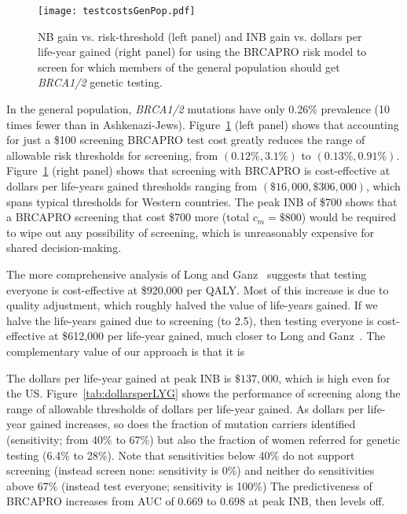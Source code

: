 \documentclass[11pt, letterpaper]{article}
\begin{document}
\begin{figure}[t!]
	\centering
	\texttt{[image: testcostsGenPop.pdf]}
	\caption{NB gain vs. risk-threshold (left panel) and INB gain vs. dollars per life-year gained (right panel) for using the BRCAPRO risk model to screen for which members of the general population should get \textit{BRCA1/2} genetic testing.}
	\label{fig:testcostsGenPop}
\end{figure}

In the general population, \textit{BRCA1/2} mutations have only 0.26\% prevalence (10 times fewer than in Ashkenazi-Jews).  Figure~\ref{fig:testcostsGenPop} (left panel) shows that accounting for just a \$100 screening BRCAPRO test cost greatly reduces the range of allowable risk thresholds for screening, from $(0.12\%,3.1\%)$ to $(0.13\%,0.91\%)$.  Figure~\ref{fig:testcostsGenPop} (right panel) shows that screening with BRCAPRO is cost-effective at dollars per life-years gained thresholds ranging from $(\$16,\!000,\$306,\!000)$, which spans typical thresholds for Western countries.  The peak INB of \$700 shows that a BRCAPRO screening that cost \$700 more (total $c_m=\$800$) would be required to wipe out any possibility of screening, which is unreasonably expensive for shared decision-making.  

The more comprehensive analysis of Long and Ganz~\cite{Long2015} suggests that testing everyone is cost-effective at \$920,000 per QALY.  Most of this increase is due to quality adjustment, which roughly halved the value of life-years gained.  If we halve the life-years gained due to screening (to 2.5), then testing everyone is cost-effective at \$612,000 per life-year gained, much closer to Long and Ganz~\cite{Long2015}.  The complementary value of our approach is that it is 

The dollars per life-year gained at peak INB is $\$137,\!000$, which is high even for the US.  Figure~\ref{tab:dollarsperLYG} shows the performance of screening along the range of allowable thresholds of dollars per life-year gained.  As dollars per life-year gained increases, so does the fraction of mutation carriers identified (sensitivity; from 40\% to 67\%) but also the fraction of women referred for genetic testing (6.4\% to 28\%).  Note that sensitivities below 40\% do not support screening (instead screen none: sensitivity is 0\%) and neither do sensitivities above 67\% (instead test everyone; sensitivity is 100\%) The predictiveness of BRCAPRO increases from AUC of 0.669 to 0.698 at peak INB, then levels off.  
\end{document}
